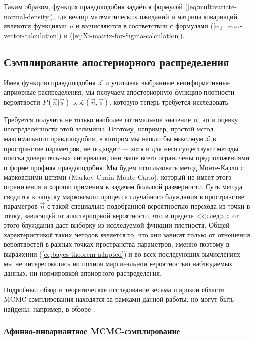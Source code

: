 Таким образом, функция правдоподобия задаётся формулой (\ref{eq:multivariate-normal-density}), где вектор математических ожиданий и матрица ковариаций являются функциями $\vec{n}$ и вычисляются в соответствии с формулами (\ref{eq:mean-vector-calculation}) и (\ref{eq:Xi-matrix-for-Sigma-calculation}).

\subsection{Сэмплирование апостериорного распределения}

\label{sec:mcmc-sampling}

Имея функцию правдоподобия $\mathcal{L}$ и учитывая выбранные неинформативные априорные распределения, мы получаем апостериорную функцию плотности вероятности $P(\vec{n} | \vec{s}) \propto \mathcal{L}(\vec{n}, \vec{s})$, которую теперь требуется исследовать.

Требуется получить не только наиболее оптимальное значение $\vec{n}$, но и оценку неопределённости этой величины. Поэтому, например, простой метод максимального правдоподобия, в котором мы нашли бы максимум $\mathcal{L}$ в пространстве параметров, не подходит --- хотя и для него существуют методы поиска доверительных интервалов, они чаще всего ограничены предположениями о форме профиля правдоподобия. Мы будем использовать метод Монте-Карло с марковскими цепями (Markov Chain Monte Carlo), который не имеет этого ограничения и хорошо применим к задачам большой размерности. Суть метода сводится к запуску марковского процесса случайного блуждания в пространстве параметров $\vec{n}$ с такой специально подобранной вероятностью перехода из точки в точку, зависящей от апостериорной вероятности, что в пределе <<след>> от этого блуждания даст выборку из исследуемой функции плотности. Общей характеристикой таких методов является то, что они зависят только от отношения вероятностей в разных точках пространства параметров, именно поэтому в выражении (\ref{eq:bayes-theorem-adapted}) и во всех последующих вычислениях мы не интересовались ни полной маргинальной вероятностью наблюдаемых данных, ни нормировкой априорного распределения.

Подробный обзор и теоретическое исследование весьма широкой области MCMC-сэмплирования находятся за рамками данной работы, но могут быть найдены, например, в обзоре \cite{Sharma2017}.

\subsubsection{Афинно-инвариантное MCMC-сэмплирование}

